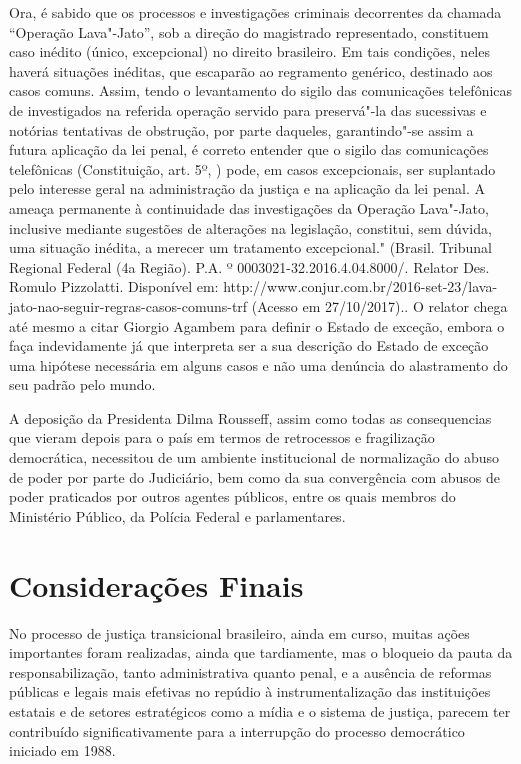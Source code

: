 {  Ora, é sabido que os processos e investigações criminais decorrentes
  da chamada ``Operação Lava"-Jato'', sob a direção do magistrado
  representado, constituem caso inédito (único, excepcional) no direito
  brasileiro. Em tais condições, neles haverá situações inéditas, que
  escaparão ao regramento genérico, destinado aos casos comuns. Assim,
  tendo o levantamento do sigilo das comunicações telefônicas de
  investigados na referida operação servido para preservá"-la das
  sucessivas e notórias tentativas de obstrução, por parte daqueles,
  garantindo"-se assim a futura aplicação da lei penal, é correto
  entender que o sigilo das comunicações telefônicas (Constituição, art.
  5º, ) pode, em casos excepcionais, ser suplantado pelo interesse
  geral na administração da justiça e na aplicação da lei penal. A
  ameaça permanente à continuidade das investigações da Operação
  Lava"-Jato, inclusive mediante sugestões de alterações na legislação,
  constitui, sem dúvida, uma situação inédita, a merecer um tratamento
  excepcional." (Brasil. Tribunal Regional Federal (4a Região). P.A.
    º 0003021-32.2016.4.04.8000/. Relator Des. Romulo
  Pizzolatti. Disponível em:
  http://www.conjur.com.br/2016-set-23/lava-jato-nao-seguir-regras-casos-comuns-trf
  (Acesso em 27/10/2017).}. O relator chega até mesmo a citar Giorgio
Agambem para definir o Estado de exceção, embora o faça indevidamente já
que interpreta ser a sua descrição do Estado de exceção uma hipótese
necessária em alguns casos e não uma denúncia do alastramento do seu
padrão pelo mundo.

A deposição da Presidenta Dilma Rousseff, assim como todas as
consequencias que vieram depois para o país em termos de retrocessos e
fragilização democrática, necessitou de um ambiente institucional de
normalização do abuso de poder por parte do Judiciário, bem como da sua
convergência com abusos de poder praticados por outros agentes públicos,
entre os quais membros do Ministério Público, da Polícia Federal e
parlamentares.

\section{Considerações Finais}

No processo de justiça transicional brasileiro, ainda em curso, muitas
ações importantes foram realizadas, ainda que tardiamente, mas o
bloqueio da pauta da responsabilização, tanto administrativa quanto
penal, e a ausência de reformas públicas e legais mais efetivas no
repúdio à instrumentalização das instituições estatais e de setores
estratégicos como a mídia e o sistema de justiça, parecem ter
contribuído significativamente para a interrupção do processo
democrático iniciado em 1988.

